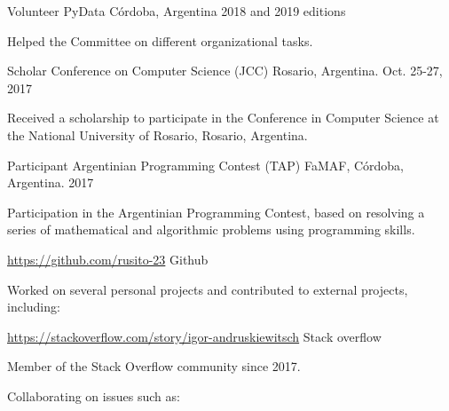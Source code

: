 \documentclass[11pt, a4paper]{resume}
\begin{document}
\begin{cventries}

  \cventry
    {Volunteer}
    {PyData}
    {Córdoba, Argentina}
    {2018 and 2019 editions}
    {
      \begin{cvitems}
		\item {Helped the Committee on different organizational tasks.}
      \end{cvitems}
    }

  \cventry
    {Scholar}
    {Conference on Computer Science (JCC)}
    {Rosario, Argentina.}
    {Oct. 25-27, 2017}
    {
      \begin{cvitems}
        \item {Received a scholarship to participate in the Conference in Computer Science at the National University of Rosario, Rosario, Argentina.}
      \end{cvitems}
    }

  \cventry
    {Participant}
    {Argentinian Programming Contest (TAP)}
    {FaMAF, Córdoba, Argentina.}
    {2017}
    {
      \begin{cvitems}
        \item {Participation in the Argentinian Programming Contest, based on resolving a series of mathematical and algorithmic problems using programming skills.}
      \end{cvitems}
    }

  \cventry
    {\href{https://github.com/rusito-23}{https://github.com/rusito-23}}
    {Github}
    {}
    {}
    {
      \begin{cvitems}
        \item {Worked on several personal projects and contributed to external projects, including:}
      \end{cvitems}
    }

  \cventry
    {\href{https://stackoverflow.com/story/igor-andruskiewitsch}{https://stackoverflow.com/story/igor-andruskiewitsch}}
    {Stack overflow}
    {}
    {}
    {
      \begin{cvitems}
        \item {Member of the Stack Overflow community since 2017.}
        \item {Collaborating on issues such as:}
      \end{cvitems}
    }

\end{cventries}


\end{document}
